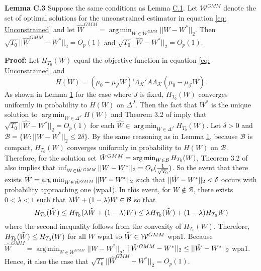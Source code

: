 \documentclass{article}
\DeclareMathOperator*{\argmin}{arg\,min}
\begin{document}
\textbf{Lemma C.3}\label{LC3} Suppose the same conditions as Lemma \hyperref[LC1]{C.1}. Let $\mathcal{W}^{GMM}$ denote the set of optimal solutions for the unconstrained estimator in equation \eqref{eq: Unconstrained} and let $\hat{W}^{GMM} = \argmin_{W \in \mathcal{W}^{GMM}} ||W - W^*||_2$. Then $\sqrt{T_0}||\hat{W}^{GMM} - W^*||_2 = O_p(1)$ and $\sqrt{T_0}||\hat{W} - W^*||_2 = O_p(1)$.

\textbf{Proof:}
 Let $H_{T_0}(W)$ equal the objective function in equation \eqref{eq: Unconstrained} and 
\begin{equation*}
    H(W) = (\mu_0 - \mu_{\mathcal{J}}W)'\Lambda_{\mathcal{K}}' A \Lambda_{\mathcal{K}} (\mu_0 - \mu_{\mathcal{J}}W).
\end{equation*}
As shown in Lemma \hyperref[L1]{1} for the case where $J$ is fixed, $H_{T_0}(W)$ converges uniformly in probability to $H(W)$ on $\Delta^J$. Then the fact that $W^*$ is the unique solution to $\argmin_{W \in \Delta^J} H(W)$ and Theorem 3.2 of \cite{PartialGMM} imply that $\sqrt{T_0}||\hat{W} - W^*||_2 = O_p(1)$ for each $\hat{W} \in \argmin_{W \in \Delta^J}  H_{T_0}(W)$. Let $\delta > 0$ and $\mathcal{B} = \{W : ||W - W^*||_2 \leq 2\delta \}$. By the same reasoning as in Lemma \hyperref[L1]{1}, because $\mathcal{B}$ is compact, $H_{T_0}(W)$ converges uniformly in probability to $H(W)$ on $\mathcal{B}$. Therefore, for
the solution set $\Tilde{W}^{GMM} = \argmin_{W \in \mathcal{B}} H_{T_0}(W)$, Theorem 3.2 of \cite{PartialGMM} also implies that $\inf_{W \in \Tilde{W}^{GMM}} ||W - W^*||_2 = O_p(\frac{1}{\sqrt{T_0}})$. So the event that there exists $\Tilde{W} = \argmin_{W \in \Tilde{\mathcal{W}}^{GMM}} ||W - W^*||_2$ such that $||\Tilde{W} - W^*||_2 < \delta$ occurs with probability approaching one (wpa1). In this event, for $W \notin \mathcal{B}$, there exists $0 < \lambda < 1$ such that $\lambda \Tilde{W} + (1 - \lambda)W \in \mathcal{B}$ so that
\begin{equation*}
    H_{T_0}(\Tilde{W}) \leq H_{T_0}(\lambda \Tilde{W} + (1-\lambda)W) \leq  \lambda H_{T_0}(\Tilde{W}) + 
    (1-\lambda)H_{T_0}  W)
\end{equation*}
where the second inequality follows from the convexity of $H_{T_0}(W)$. Therefore, $H_{T_0}(\Tilde{W}) \leq H_{T_0}(W)$ for all $W$ wpa1 so $\Tilde{W} \in \mathcal{W}^{GMM}$ wpa1. Because $\hat{W}^{GMM} = \argmin_{W \in \mathcal{W}^{GMM}} ||W - W^*||_2$,  $||\hat{W}^{GMM} - W^*||_2 \leq ||\Tilde{W} - W^*||_2$ wpa1. Hence, it also the case that $\sqrt{T_0}||\hat{W}^{GMM} - W^*||_2 = O_p(1)$.
\end{document}
